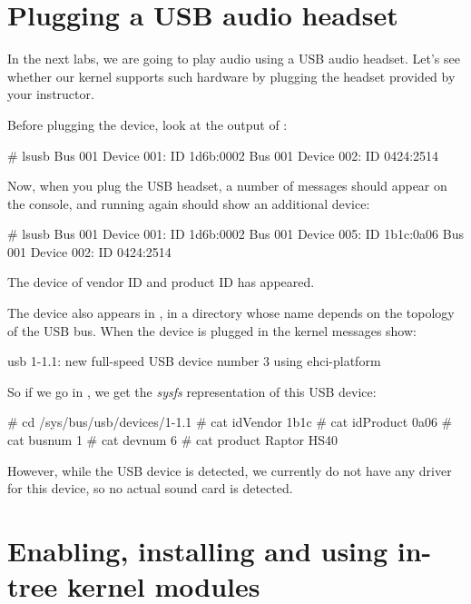 \section{Plugging a USB audio headset}

In the next labs, we are going to play audio using a USB audio headset.
Let's see whether our kernel supports such hardware by plugging the
headset provided by your instructor.

Before plugging the device, look at the output of :

\begin{bashinput}
# lsusb
Bus 001 Device 001: ID 1d6b:0002
Bus 001 Device 002: ID 0424:2514
\end{bashinput}

Now, when you plug the USB headset, a number of messages should appear
on the console, and running  again should show an
additional device:

\begin{bashinput}
# lsusb
Bus 001 Device 001: ID 1d6b:0002
Bus 001 Device 005: ID 1b1c:0a06
Bus 001 Device 002: ID 0424:2514
\end{bashinput}

The device of vendor ID  and product ID  has
appeared.

The device also appears in , in a
directory whose name depends on the topology of the USB bus. When the
device is plugged in the kernel messages show:

\begin{bashinput}
usb 1-1.1: new full-speed USB device number 3 using ehci-platform
\end{bashinput}

So if we go in , we get the {\em
sysfs} representation of this USB device:

\begin{bashinput}
# cd /sys/bus/usb/devices/1-1.1
# cat idVendor
1b1c
# cat idProduct
0a06
# cat busnum
1
# cat devnum
6
# cat product
Raptor HS40
\end{bashinput}

However, while the USB device is detected, we currently do not have
any driver for this device, so no actual sound card is detected.

\section{Enabling, installing and using in-tree kernel modules}

